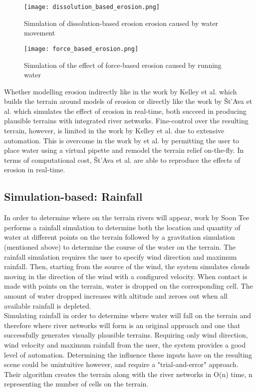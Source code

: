 \begin{figure}[h]
  \centering
	\texttt{[image: dissolution\_based\_erosion.png]}
	\caption{Simulation of dissolution-based erosion erosion caused by water movement\cite{StAva2008}}
	\label{fig:dissolution_based_erosion}
\end{figure}

\begin{figure}[h]
  \centering
	\texttt{[image: force\_based\_erosion.png]}
	\caption{Simulation of the effect of force-based erosion caused by running water \cite{StAva2008}}
	\label{fig:force_based_erosion}
\end{figure}

Whether modelling erosion indirectly like in the work by Kelley et al. \cite{Kelley1988} which builds the terrain around models of erosion or directly like the work by Št'Ava et al. \cite{StAva2008} which simulates the effect of erosion in real-time, both succeed in producing plausible terrains with integrated river networks. Fine-control over the resulting terrain, however, is limited in the work by Kelley et al. \cite{Kelley1988} due to extensive automation. This is overcome in the work by \cite{StAva2008} et al. by permitting the user to place water using a virtual pipette and remodel the terrain relief on-the-fly. In terms of computational cost, Št'Ava et al. \cite{StAva2008} are able to reproduce the effects of erosion in real-time.  

\subsection{Simulation-based: Rainfall}

In order to determine where on the terrain rivers will appear, work by Soon Tee \cite{Teoh2008} performs a rainfall simulation to determine both the location and quantity of water at different points on the terrain followed by a gravitation simulation (mentioned above) to determine the course of the water on the terrain. The rainfall simulation requires the user to specify wind direction and maximum rainfall. Then, starting from the source of the wind, the system simulates clouds moving in the direction of the wind with a configured velocity. When contact is made with points on the terrain, water is dropped on the corresponding cell. The amount of water dropped increases with altitude and zeroes out when all available rainfall is depleted. \\

Simulating rainfall in order to determine where water will fall on the terrain and therefore where river networks will form is an original approach and one that successfully generates visually plausible terrains. Requiring only wind direction, wind velocity and maximum rainfall from the user, the system provides a good level of automation. Determining the influence these inputs have on the resulting scene could be unintuitive however, and require a "trial-and-error" approach. Their algorithm creates the terrain along with the river networks in O(n) time, n representing the number of cells on the terrain.

